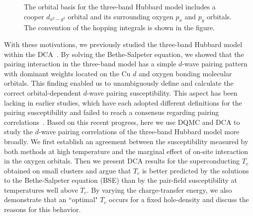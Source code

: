 \documentclass[reprint,nofootinbib,nobibnotes,amsmath,amssymb,aps,prb,floatfix]{revtex4-1}
\begin{document}
\begin{figure}[b]
\caption{ The orbital basis for the three-band Hubbard model includes a cooper $d_{x^2-y^2}$ orbital and its surrounding oxygen $p_x$ and $p_y$ orbitals. The convention of the hopping integrals is shown in the figure.
}
\label{threeband}
\end{figure}

With these motivations, we previously studied the three-band Hubbard model within the DCA~\cite{Mai}. By solving the Bethe-Salpeter equation, we showed that the pairing interaction in the three-band model has a simple $d$-wave pairing pattern with dominant weights located on the Cu $d$ and oxygen bonding molecular orbitals. This finding enabled us to unambiguously define and calculate the correct orbital-dependent $d$-wave pairing susceptibility. This aspect has been lacking in earlier studies, which have each adopted different definitions for the pairing susceptibility and failed to reach a consensus regarding pairing correlations~\cite{Scalettar, Guerrero,  Moreo, Biborski}. Based on this recent progress, here we use DQMC and DCA to study the $d$-wave pairing correlations of the three-band Hubbard model more broadly. We first establish an agreement between the susceptibility measured by both methods at high temperature and the marginal effect of on-site interaction in the oxygen orbitals. Then we present DCA results for the superconducting $T_c$ obtained on small clusters and argue that $T_c$ is better predicted by the solutions to the Bethe-Salpeter equation (BSE) than by the pair-field susceptibility at temperatures well above $T_c$. By varying the charge-transfer energy, we also demonstrate that an ``optimal" $T_c$ occurs for a fixed hole-density and discuss the reasons for this behavior. 
\end{document}
